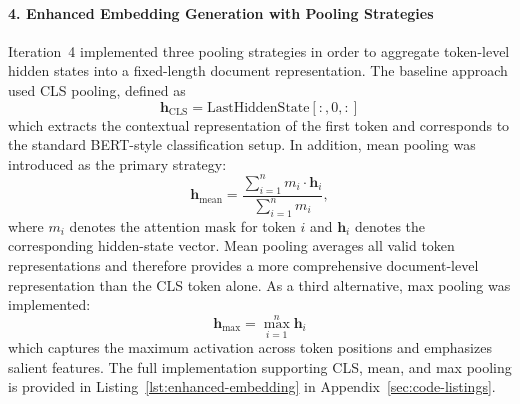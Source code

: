 \documentclass[11pt, titlepage, bibliography=totoc]{scrreprt}
\begin{document}
\paragraph{4. Enhanced Embedding Generation with Pooling Strategies}
Iteration~4 implemented three pooling strategies in order to aggregate token-level hidden states into a fixed-length document representation. The baseline approach used CLS pooling, defined as
\begin{equation}
\mathbf{h}_{\text{CLS}} = \text{LastHiddenState}[:, 0, :]
\end{equation}
which extracts the contextual representation of the first token and corresponds to the standard BERT-style classification setup. In addition, mean pooling was introduced as the primary strategy:
\begin{equation}
\mathbf{h}_{\text{mean}} = \frac{\sum_{i=1}^{n} m_i \cdot \mathbf{h}_i}{\sum_{i=1}^{n} m_i},
\end{equation}
where $m_i$ denotes the attention mask for token $i$ and $\mathbf{h}_i$ denotes the corresponding hidden-state vector. Mean pooling averages all valid token representations and therefore provides a more comprehensive document-level representation than the CLS token alone. As a third alternative, max pooling was implemented:
\begin{equation}
\mathbf{h}_{\text{max}} = \max_{i=1}^{n} \mathbf{h}_i
\end{equation}
which captures the maximum activation across token positions and emphasizes salient features. The full implementation supporting CLS, mean, and max pooling is provided in Listing~\ref{lst:enhanced-embedding} in Appendix~\ref{sec:code-listings}.
\end{document}
